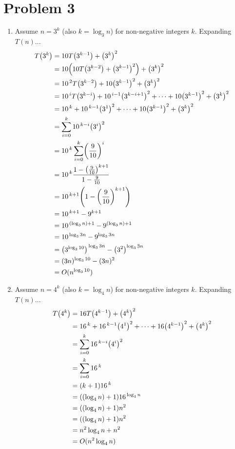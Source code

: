 \documentclass[12pt,a4paper]{article}
\begin{document}
	\section*{Problem 3}
		\begin{enumerate}[label=(\alph*)]
			\item Assume $n = 3^k$ (also $k = \log_3 n$) for non-negative integers $k$. Expanding $T(n)$...
			\begin{align*}
				T\parens*{3^k} &= 10T\parens*{3^{k-1}} + \parens*{3^k}^2 \\
				&= 10 \parens*{ 10T\parens*{3^{k-2}} + \parens*{3^{k-1}}^2 } + \parens*{3^k}^2 \\
				&= 10^{\,2} T\parens*{3^{k-2}} + 10 \parens*{3^{k-1}}^2 + \parens*{3^k}^2 \\
				&= 10^{\,i} T\parens*{3^{k-i}} + 10^{\,i-1}\parens*{3^{k-i+1}}^2 + \cdots + 10\parens*{3^{k-1}}^2 + \parens*{3^k}^2 \\
				&= 10^{\,k} + 10^{\,k-1}\parens*{3^{1}}^2 + \cdots + 10\parens*{3^{k-1}}^2 + \parens*{3^k}^2 \\
				&= \sum_{i=0}^k 10^{\,k - i} \parens*{3^i}^2 \\
				&= 10^{\,k} \sum_{i=0}^k \parens*{\frac{9}{10}}^i \\
				&= 10^{\,k} \frac{1 - \parens*{\frac{9}{10}}^{k + 1}}{1 - \frac{9}{10}} \\
				&= 10^{\,k + 1} \parens*{1 - \parens*{\frac{9}{10}}^{k + 1}} \\
				&= 10^{\,k + 1} - 9^{k + 1} \\
				&= 10^{\,(\log_3 n) + 1} - 9^{(\log_3 n) + 1} \\
				&= 10^{\,\log_3 3n} - 9^{\log_3 3n} \\
				&= \parens*{3^{\log_3 10}}^{\,\log_3 3n} - \parens*{3^2}^{\log_3 3n} \\
				&= (3n)^{\log_3 10} - (3n)^2 \\
				&= O(n^{\log_3 10})
			\end{align*}

			\item Assume $n = 4^k$ (also $k = \log_4 n$) for non-negative integers $k$. Expanding $T(n)$...
			\begin{align*}
				T\parens*{4^k} &= 16T\parens*{4^{k-1}} + \parens*{4^k}^2 \\
				&= 16^{\,k} + 16^{\,k-1}\parens*{4^{1}}^2 + \cdots + 16\parens*{4^{k-1}}^2 + \parens*{4^k}^2 \\
				&= \sum_{i=0}^k 16^{\,k - i} \parens*{4^i}^2 \\
				&= \sum_{i=0}^k 16^{\,k} \\
				&= (k + 1)16^{\,k} \\
				&= ((\log_4 n) + 1)16^{\,\log_4 n} \\
				&= ((\log_4 n) + 1)n^2 \\
				&= ((\log_4 n) + 1)n^2 \\
				&= n^2 \log_4 n + n^2 \\
				&= O(n^2 \log_4 n)
			\end{align*}
		\end{enumerate}
\end{document}
